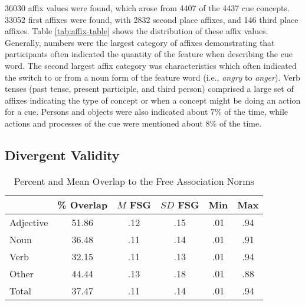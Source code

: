 \documentclass[english,man]{apa6}
\theoremstyle{definition}
\theoremstyle{definition}
\theoremstyle{definition}
\theoremstyle{remark}
\begin{document}
36030 affix values were found, which arose from 4407 of the 4437 cue
concepts. 33052 first affixes were found, with 2832 second place
affixes, and 146 third place affixes. Table \ref{tab:affix-table} shows
the distribution of these affix values. Generally, numbers were the
largest category of affixes demonstrating that participants often
indicated the quantity of the feature when describing the cue word. The
second largest affix category was characteristics which often indicated
the switch to or from a noun form of the feature word (i.e.,
\emph{angry} to \emph{anger}). Verb tenses (past tense, present
participle, and third person) comprised a large set of affixes
indicating the type of concept or when a concept might be doing an
action for a cue. Persons and objects were also indicated about 7\% of
the time, while actions and processes of the cue were mentioned about
8\% of the time.

\subsection{Divergent Validity}\label{divergent-validity}

\begin{table}[tbp]
\begin{center}
\begin{threeparttable}
\caption{\label{tab:divergent-table}Percent and Mean Overlap to the Free Association Norms}
\begin{tabular}{lccccc}
\toprule
  & \% Overlap & $M$ FSG & $SD$ FSG & Min & Max\\
\midrule
Adjective & 51.86 & .12 & .15 & .01 & .94\\
Noun & 36.48 & .11 & .14 & .01 & .91\\
Verb & 32.15 & .11 & .13 & .01 & .94\\
Other & 44.44 & .13 & .18 & .01 & .88\\
Total & 37.47 & .11 & .14 & .01 & .94\\
\bottomrule
\end{tabular}
\end{threeparttable}
\end{center}
\end{table}
\end{document}

